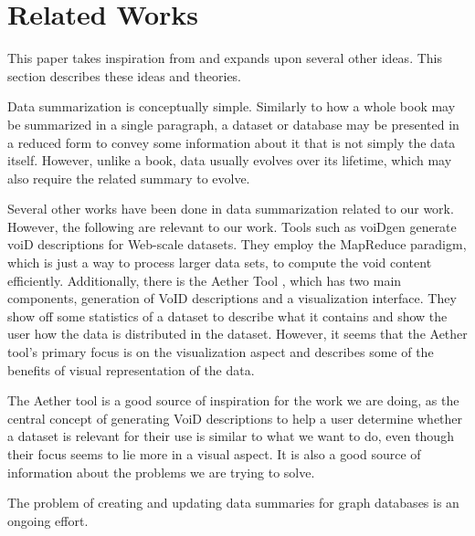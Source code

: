 \section{Related Works}\label{sec:related-works}
This paper takes inspiration from and expands upon several other ideas. This section describes these ideas and theories.

Data summarization is conceptually simple. Similarly to how a whole book may be summarized in a single paragraph, a dataset or database may be presented in a reduced form to convey some information about it that is not simply the data itself. However, unlike a book, data usually evolves over its lifetime, which may also require the related summary to evolve.

Several other works have been done in data summarization related to our work. However, the following are relevant to our work. Tools such as voiDgen\cite{creating-void-descriptions} generate voiD descriptions for Web-scale datasets. They employ the MapReduce paradigm, which is just a way to process larger data sets\cite{the-mapreduce-paradigm}, to compute the void content efficiently.
Additionally, there is the Aether Tool \cite{aether-tool}, which has two main components, generation of VoID descriptions and a visualization interface. They show off some statistics of a dataset to describe what it contains and show the user how the data is distributed in the dataset. However, it seems that the Aether tool's primary focus is on the visualization aspect and describes some of the benefits of visual representation of the data.

The Aether tool is a good source of inspiration for the work we are doing, as the central concept of generating VoiD descriptions to help a user determine whether a dataset is relevant for their use is similar to what we want to do, even though their focus seems to lie more in a visual aspect. It is also a good source of information about the problems we are trying to solve.

The problem of creating and updating data summaries for graph databases is an ongoing effort.


